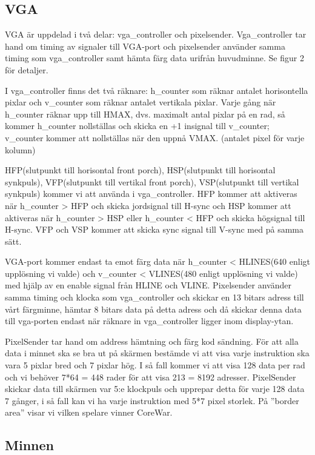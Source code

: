 \documentclass[11pt]{article}
\begin{document}
\subsection{VGA}

VGA är uppdelad i två delar: vga\_controller och pixelsender. Vga\_controller tar hand om timing av signaler till VGA-port och pixelsender använder samma timing som vga\_controller samt hämta färg data urifrån huvudminne. Se figur 2 för detaljer.

I vga\_controller finns det två räknare: h\_counter som räknar antalet horisontella pixlar och v\_counter som räknar antalet vertikala pixlar. Varje gång när h\_counter räknar upp till HMAX, dvs. maximalt antal pixlar på en rad, så kommer h\_counter nollställas och skicka en +1 insignal till v\_counter; v\_counter kommer att nollställas när den uppnå VMAX. (antalet pixel för varje kolumn)

HFP(slutpunkt till horisontal front porch), HSP(slutpunkt till horisontal synkpuls), VFP(slutpunkt till vertikal front porch), VSP(slutpunkt till vertikal synkpuls) kommer vi att använda i vga\_controller. HFP kommer att aktiveras när h\_counter > HFP och skicka jordsignal till H-sync och HSP kommer att aktiveras när h\_counter > HSP eller h\_counter < HFP och skicka högsignal till H-sync. VFP och VSP kommer att skicka sync signal till V-sync med på samma sätt.


VGA-port kommer endast ta emot färg data när h\_counter < HLINES(640 enligt upplösning vi valde) och v\_counter < VLINES(480 enligt upplösning vi valde) med hjälp av en enable signal från HLINE och VLINE.
Pixelsender använder samma timing och klocka som vga\_controller och skickar en 13 bitars adress till vårt färgminne, hämtar 8 bitars data på detta adress och då skickar denna data till vga-porten endast när räknare in vga\_controller ligger inom display-ytan.

PixelSender tar hand om address hämtning och färg kod sändning. För att alla data i minnet ska se bra ut på skärmen bestämde vi att visa varje instruktion ska vara 5 pixlar bred och 7 pixlar hög. I så fall kommer vi att visa 128 data per rad och vi behöver 7*64 = 448 rader för att visa 213 = 8192 adresser. PixelSender skickar data till skärmen var 5:e klockpuls och upprepar detta för varje 128 data 7 gånger, i så fall kan vi ha varje instruktion med 5*7 pixel storlek. På ”border area” visar vi vilken spelare vinner CoreWar.

\subsection{Minnen}
\end{document}
